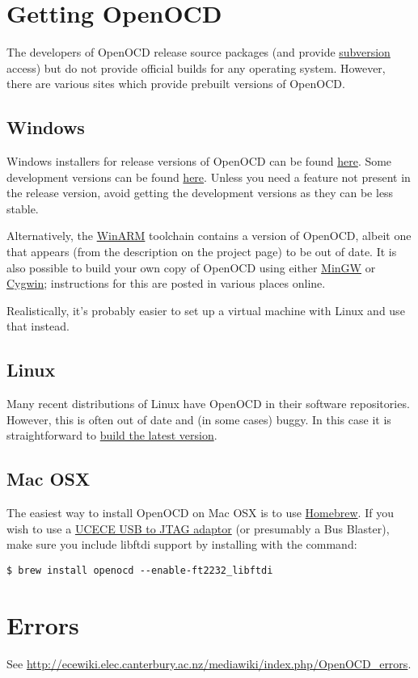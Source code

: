 \section{Getting OpenOCD}
\label{getting-openocd}

The developers of OpenOCD release source packages (and provide
\url{subversion} access) but do not provide official builds for any
operating system. However, there are various sites which provide
prebuilt versions of OpenOCD.

\subsection{Windows}
\label{windows}

Windows installers for release versions of OpenOCD can be found
\href{http://www.freddiechopin.info/index.php/en/download/category/4-openocd}{here}.
Some development versions can be found
\href{http://www.freddiechopin.info/index.php/en/download/category/10-openocd-dev}{here}.
Unless you need a feature not present in the release version, avoid
getting the development versions as they can be less stable.

Alternatively, the
\href{http://www.siwawi.arubi.uni-kl.de/avr_projects/arm_projects/}{WinARM}
toolchain contains a version of OpenOCD, albeit one that appears (from
the description on the project page) to be out of date. It is also
possible to build your own copy of OpenOCD using either
\href{http://www.mingw.org/}{MinGW} or
\href{http://www.cygwin.com/}{Cygwin}; instructions for this are posted
in various places online.

Realistically, it's probably easier to set up a virtual machine with
Linux and use that instead.

\subsection{Linux}
\label{linux}

Many recent distributions of Linux have OpenOCD in their software
repositories. However, this is often out of date and (in some cases)
buggy. In this case it is straightforward to
\href{Building_OpenOCD_under_Linux}{build the latest version}.

\subsection{Mac OSX}
\label{mac-osx}

The easiest way to install OpenOCD on Mac OSX is to use
\href{http://brew.sh/}{Homebrew}. If you wish to use a
\href{USB_to_JTAG}{UCECE USB to JTAG adaptor} (or presumably a Bus
Blaster), make sure you include libftdi support by installing with the
command:

\begin{verbatim}
$ brew install openocd --enable-ft2232_libftdi
\end{verbatim}

\section{Errors}
\label{errors}

See \url{http://ecewiki.elec.canterbury.ac.nz/mediawiki/index.php/OpenOCD_errors}.
